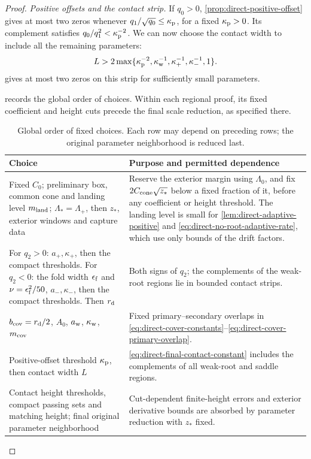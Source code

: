 \begin{proof}
\emph{Positive offsets and the contact strip.}
If \(q_0>0\), \cref{prop:direct-positive-offset} gives at most two
zeros whenever \(q_1/\sqrt{q_0}\le\kappa_{\rm p}\), for a fixed
\(\kappa_{\rm p}>0\). Its complement satisfies
\(q_0/q_1^2<\kappa_{\rm p}^{-2}\). We can now choose the contact
width to include all the remaining parameters:
\begin{equation}
\label{eq:direct-final-contact-constant}
 L>2\max\{\kappa_{\rm p}^{-2},\kappa_{\rm w}^{-1},
                         \kappa_+^{-1},\kappa_-^{-1},1\}.
\end{equation}
 gives at most two zeros on this
strip for sufficiently small parameters.

 records the global order of choices.
Within each regional proof, its fixed coefficient and height cuts precede
the final scale reduction, as specified there.
\begin{table}[ht]
\centering
\small
\caption{Global order of fixed choices. Each row may depend on preceding
rows; the original parameter neighborhood is reduced last.}
\label{tab:direct-constant-order}
\begin{tabular}{@{}>{\raggedright\arraybackslash}p{}
                >{\raggedright\arraybackslash}p{}@{}}
\hline
Choice & Purpose and permitted dependence\\
\hline
Fixed \(C_0\); preliminary box, common cone and landing level
\(m_{\rm land}\); \(\Lambda_*=\Lambda_+\), then \(z_*\), exterior windows
and capture data
  & Reserve the exterior margin using \(\Lambda_0\), and fix
    \(2C_{\rm cone}\sqrt{z_*}\) below a fixed fraction of it, before any
    coefficient or height threshold. The landing level is small for
    \cref{lem:direct-adaptive-positive} and
    \eqref{eq:direct-no-root-adaptive-rate}, which use only bounds of the
    drift factors.\\
For \(q_2>0\): \(a_+,\kappa_+\), then the compact thresholds. For
\(q_2<0\): the fold width \(\epsilon_{\rm f}\) and
\(\nu=\epsilon_{\rm f}^2/50\), \(a_-,\kappa_-\), then the compact
thresholds. Then \(r_{\rm d}\)
  & Both signs of \(q_2\); the complements of the weak-root regions lie
    in bounded contact strips.\\
\(b_{\rm cov}=r_{\rm d}/2\), \(A_0\), \(a_{\rm w}\), \(\kappa_{\rm w}\),
\(m_{\rm cov}\)
  & Fixed primary--secondary overlaps in
    \eqref{eq:direct-cover-constants}--\eqref{eq:direct-cover-primary-overlap}.\\
Positive-offset threshold \(\kappa_{\rm p}\), then contact width \(L\)
  & \eqref{eq:direct-final-contact-constant} includes the complements of
    all weak-root and saddle regions.\\
Contact height thresholds, compact passing sets and matching height;
final original parameter neighborhood
  & Cut-dependent finite-height errors and exterior derivative bounds
    are absorbed by parameter reduction with \(z_*\) fixed.\\
\hline
\end{tabular}


\end{table}
\end{proof}
